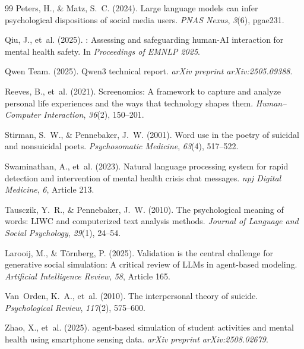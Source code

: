 \documentclass[review,12pt,authoryear]{elsarticle}
\begin{document}
\begin{thebibliography}{99}
Peters, H., \& Matz, S.~C. (2024).
\newblock Large language models can infer psychological dispositions of social media users.
\newblock \textit{PNAS Nexus}, \textit{3}(6), pgae231.

Qiu, J., et~al. (2025).
: {A}ssessing and safeguarding human-{AI} interaction for mental health safety.
\newblock In \textit{Proceedings of EMNLP 2025}.

Qwen Team. (2025).
\newblock Qwen3 technical report.
\newblock \textit{arXiv preprint arXiv:2505.09388}.

Reeves, B., et~al. (2021).
\newblock Screenomics: {A} framework to capture and analyze personal life experiences and the ways that technology shapes them.
\newblock \textit{Human--Computer Interaction}, \textit{36}(2), 150--201.

Stirman, S.~W., \& Pennebaker, J.~W. (2001).
\newblock Word use in the poetry of suicidal and nonsuicidal poets.
\newblock \textit{Psychosomatic Medicine}, \textit{63}(4), 517--522.

Swaminathan, A., et~al. (2023).
\newblock Natural language processing system for rapid detection and intervention of mental health crisis chat messages.
\newblock \textit{npj Digital Medicine}, \textit{6}, Article 213.

Tausczik, Y.~R., \& Pennebaker, J.~W. (2010).
\newblock The psychological meaning of words: {LIWC} and computerized text analysis methods.
\newblock \textit{Journal of Language and Social Psychology}, \textit{29}(1), 24--54.

Larooij, M., \& T{\"o}rnberg, P. (2025).
\newblock Validation is the central challenge for generative social simulation: {A} critical review of {LLMs} in agent-based modeling.
\newblock \textit{Artificial Intelligence Review}, \textit{58}, Article 165.

Van~Orden, K.~A., et~al. (2010).
\newblock The interpersonal theory of suicide.
\newblock \textit{Psychological Review}, \textit{117}(2), 575--600.

Zhao, X., et~al. (2025).
 agent-based simulation of student activities and mental health using smartphone sensing data.
\newblock \textit{arXiv preprint arXiv:2508.02679}.

\end{thebibliography}
\end{document}

